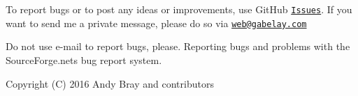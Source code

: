 To report bugs or to post any ideas or improvements, use Git\+Hub \href{https://github.com/abelayer/AbZip/issues}{\tt Issues}. If you want to send me a private message, please do so via \href{mailto:web@gabelay.com}{\tt web@gabelay.\+com}

Do not use e-\/mail to report bugs, please. Reporting bugs and problems with the Source\+Forge.\+net\textquotesingle{}s bug report system.

Copyright (C) 2016 Andy Bray and contributors 